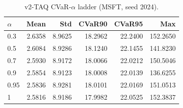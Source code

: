 \begin{table}[H]
    \centering
    \caption{v2-TAQ CVaR-$\alpha$ ladder (MSFT, seed 2024).}
    \label{tab:v2_taq_alpha}
    \begin{tabular}{@{}lrrrrr@{}}
        \toprule
        $\alpha$ & Mean & Std & CVaR90 & CVaR95 & Max \\
        \midrule
        0.3 & 2.6358 & 8.9625 & 18.2962 & 22.2400 & 152.2650 \\
        0.5 & 2.6084 & 8.9286 & 18.1240 & 22.1455 & 141.8230 \\
        0.7 & 2.5930 & 8.9172 & 18.0066 & 22.0212 & 150.5046 \\
        0.9 & 2.5854 & 8.9123 & 18.0008 & 22.0139 & 136.6255 \\
        0.95 & 2.5836 & 8.9281 & 18.0101 & 22.0169 & 151.0513 \\
        1 & 2.5816 & 8.9186 & 17.9982 & 22.0525 & 152.3837 \\
        \bottomrule
    \end{tabular}
\end{table}
